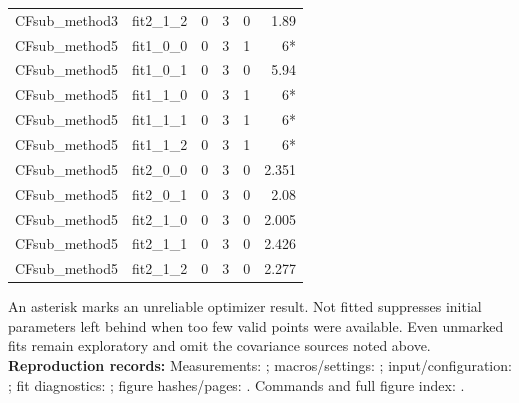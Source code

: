 \documentclass[11pt,a4paper]{article}
\begin{document}
{\begin{longtable}{llrrrr}
CFsub\_method3 & fit2\_1\_2 & 0 & 3 & 0 & 1.89\\
CFsub\_method5 & fit1\_0\_0 & 0 & 3 & 1 & 6*\\
CFsub\_method5 & fit1\_0\_1 & 0 & 3 & 0 & 5.94\\
CFsub\_method5 & fit1\_1\_0 & 0 & 3 & 1 & 6*\\
CFsub\_method5 & fit1\_1\_1 & 0 & 3 & 1 & 6*\\
CFsub\_method5 & fit1\_1\_2 & 0 & 3 & 1 & 6*\\
CFsub\_method5 & fit2\_0\_0 & 0 & 3 & 0 & 2.351\\
CFsub\_method5 & fit2\_0\_1 & 0 & 3 & 0 & 2.08\\
CFsub\_method5 & fit2\_1\_0 & 0 & 3 & 0 & 2.005\\
CFsub\_method5 & fit2\_1\_1 & 0 & 3 & 0 & 2.426\\
CFsub\_method5 & fit2\_1\_2 & 0 & 3 & 0 & 2.277\\
\hline\end{longtable}}
An asterisk marks an unreliable optimizer result. Not fitted suppresses initial parameters left behind when too few valid points were available. Even unmarked fits remain exploratory and omit the covariance sources noted above.
{\small\textbf{Reproduction records:} Measurements: ; macros/settings: ; input/configuration: ; fit diagnostics: ; figure hashes/pages: . Commands and full figure index: .}
\end{document}
